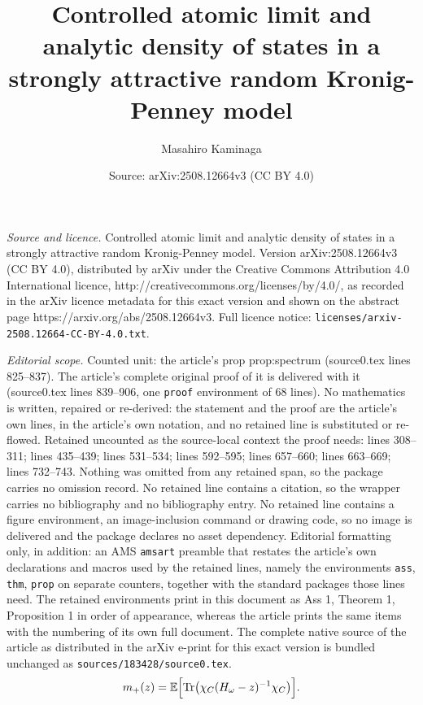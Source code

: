\documentclass[10pt,a4paper]{amsart}
\title{Controlled atomic limit and analytic density of states in a strongly attractive random Kronig-Penney model}
\author{Masahiro Kaminaga}
\date{Source: arXiv:2508.12664v3 (CC BY 4.0)}
\newcommand{\E}{\mathbb E}
\newcommand{\Tr}{\operatorname{Tr}}
\begin{document}
\maketitle

\noindent\emph{Source and licence.} Controlled atomic limit and analytic density of states in a strongly attractive random Kronig-Penney model. Version arXiv:2508.12664v3 (CC BY 4.0), distributed by arXiv under the Creative Commons Attribution 4.0 International licence, http://creativecommons.org/licenses/by/4.0/, as recorded in the arXiv licence metadata for this exact version and shown on the abstract page https://arxiv.org/abs/2508.12664v3. Full licence notice: \texttt{licenses/arxiv-2508.12664-CC-BY-4.0.txt}.\par\smallskip

\noindent\textit{Editorial scope.} Counted unit: the article's prop prop:spectrum (source0.tex lines 825--837). The article's complete original proof of it is delivered with it (source0.tex lines 839--906, one \texttt{proof} environment of 68 lines). No mathematics is written, repaired or re-derived: the statement and the proof are the article's own lines, in the article's own notation, and no retained line is substituted or re-flowed.  Retained uncounted as the source-local context the proof needs: lines 308--311; lines 435--439; lines 531--534; lines 592--595; lines 657--660; lines 663--669; lines 732--743.  Nothing was omitted from any retained span, so the package carries no omission record.  No retained line contains a citation, so the wrapper carries no bibliography and no bibliography entry.  No retained line contains a figure environment, an image-inclusion command or drawing code, so no image is delivered and the package declares no asset dependency.  Editorial formatting only, in addition: an AMS \texttt{amsart} preamble that restates the article's own declarations and macros used by the retained lines, namely the environments \texttt{ass}, \texttt{thm}, \texttt{prop} on separate counters, together with the standard packages those lines need.  The retained environments print in this document as Ass 1, Theorem 1, Proposition 1 in order of appearance, whereas the article prints the same items with the numbering of its own full document.  The complete native source of the article as distributed in the arXiv e-print for this exact version is bundled unchanged as \texttt{sources/183428/source0.tex}.
\begin{equation}
m_+(z)=\E\Bigl[\Tr\bigl(\chi_C(H_\omega-z)^{-1}\chi_C\bigr)\Bigr].
\label{mplus}
\end{equation}
\end{document}
